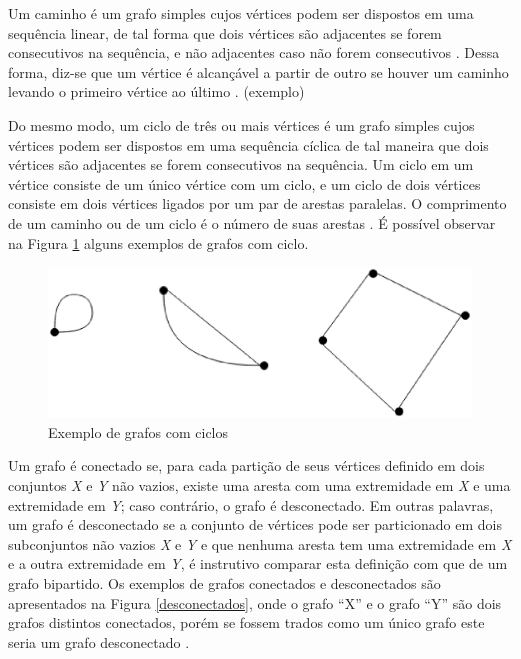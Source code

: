 Um caminho é um grafo simples cujos vértices podem ser dispostos em uma sequência linear, de tal forma que dois vértices são adjacentes se forem consecutivos na sequência, e não adjacentes caso não forem consecutivos \cite{Bondy:2007}. Dessa forma, diz-se que um vértice é alcançável a partir de outro se houver um caminho levando o primeiro vértice ao último \cite{Costa:2011}.
(exemplo)

Do mesmo modo, um ciclo de três ou mais vértices é um grafo simples cujos vértices podem ser dispostos em uma sequência cíclica de tal maneira que dois vértices são adjacentes se forem consecutivos na sequência. Um ciclo em um vértice consiste de um único vértice com um ciclo, e um ciclo de dois vértices consiste em dois vértices ligados por um par de arestas paralelas. O comprimento de um caminho ou de um ciclo é o número de suas arestas \cite{Costa:2011}. É possível observar na Figura \ref{ciclos} alguns exemplos de grafos com ciclo.

\begin{figure}[!h]
	\centering
	\includegraphics[scale=0.5]{figuras/capitulo2/ciclos.eps}
	\caption{Exemplo de grafos com ciclos}
	\label{ciclos}
\end{figure}

Um grafo é conectado se, para cada partição de seus vértices definido em dois conjuntos \textit{X} e \textit{Y} não vazios, existe uma aresta com uma extremidade em \textit{X} e uma extremidade em \textit{Y}; caso contrário, o grafo é desconectado. Em outras palavras, um grafo é desconectado se a conjunto de vértices pode ser particionado em dois subconjuntos não vazios \textit{X} e \textit{Y} e que nenhuma aresta tem uma extremidade em \textit{X} e a outra extremidade em \textit{Y}, é instrutivo comparar esta definição com que de um grafo bipartido. Os exemplos de grafos conectados e desconectados são apresentados na Figura \ref{desconectados}, onde o grafo ``X'' e o grafo ``Y'' são dois grafos distintos conectados, porém se fossem trados como um único grafo este seria um grafo desconectado \cite{Bondy:2007}.


